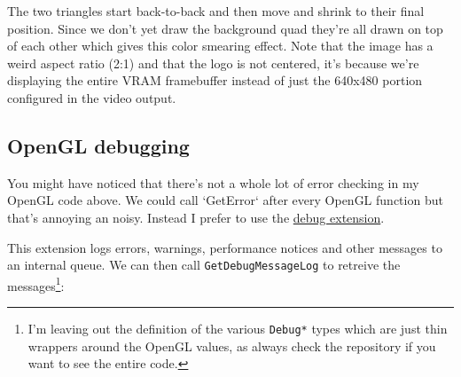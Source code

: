 \documentclass[a4paper]{article}
\newcommand{\code}[1] {\texttt{#1}}
\begin{document}
The two triangles start back-to-back and then move and shrink to their
final position. Since we don't yet draw the background quad they're
all drawn on top of each other which gives this color smearing
effect. Note that the image has a weird aspect ratio (2:1) and that
the logo is not centered, it's because we're displaying the entire
VRAM framebuffer instead of just the 640x480 portion configured in the
video output.

\subsection{OpenGL debugging}

You might have noticed that there's not a whole lot of error checking
in my OpenGL code above. We could call `GetError` after every OpenGL
function but that's annoying an noisy. Instead I prefer to use the
\href{https://www.khronos.org/registry/gles/extensions/KHR/debug.txt}{debug
  extension}.

This extension logs errors, warnings, performance notices and other
messages to an internal queue. We can then call
\code{GetDebugMessageLog} to retreive the messages\footnote{I'm
  leaving out the definition of the various \code{Debug*} types which
  are just thin wrappers around the OpenGL values, as always check the
  repository if you want to see the entire code.}:
\end{document}
